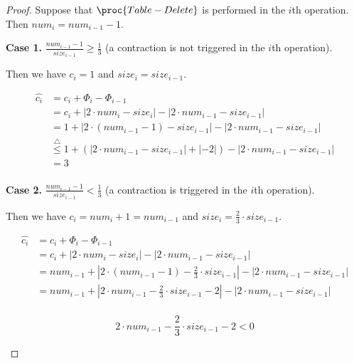 \begin{proof}
    Suppose that $\proc{Table-Delete}$ is performed in the $i$th operation.
    Then $num_i = num_{i-1} - 1$.

    \textbf{Case 1.}
    $\frac{num_{i-1}-1}{size_{i-1}} \geq \frac{1}{3}$
    (a contraction is not triggered in the $i$th operation).

    Then we have $c_i = 1$ and $size_i = size_{i-1}$.

    \begin{equation*}
    \begin{split}
        \hat{c_i} & = c_i + \Phi_i - \Phi_{i-1} \\
        & = c_i + | 2 \cdot num_i - size_i | - | 2 \cdot num_{i-1} - size_{i-1} | \\
        & = 1 + | 2 \cdot (num_{i-1} - 1) - size_{i-1} | - | 2 \cdot num_{i-1} - size_{i-1} | \\
        & \overset{\triangle}{\leq} 1 + (| 2 \cdot num_{i-1} - size_{i-1} | + | - 2 |) 
            - | 2 \cdot num_{i-1} - size_{i-1} | \\
        & = 3 \\
    \end{split}
    \end{equation*}

    \textbf{Case 2.}
    $\frac{num_{i-1}-1}{size_{i-1}} < \frac{1}{3}$
    (a contraction is triggered in the $i$th operation).

    Then we have $c_i = num_i + 1 = num_{i-1}$ and $size_i = \frac{2}{3} \cdot size_{i-1}$.

    \begin{equation*}
    \begin{split}
        \hat{c_i} & = c_i + \Phi_i - \Phi_{i-1} \\
        & = c_i + | 2 \cdot num_i - size_i | - | 2 \cdot num_{i-1} - size_{i-1} | \\
        & = num_{i-1} + | 2 \cdot (num_{i-1} - 1) - \frac{2}{3} \cdot size_{i-1} | 
            - | 2 \cdot num_{i-1} - size_{i-1} | \\
        & = num_{i-1} + | 2 \cdot num_{i-1} - \frac{2}{3} \cdot size_{i-1} - 2 | 
            - | 2 \cdot num_{i-1} - size_{i-1} | \\
    \end{split}
    \end{equation*}

    \begin{lemma}
        \begin{equation*}
            2 \cdot num_{i-1} - \frac{2}{3} \cdot size_{i-1} - 2 < 0
        \end{equation*}
    \end{lemma}


\end{proof}
